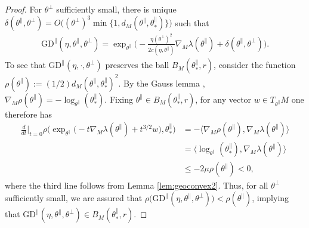 \documentclass{article}
\newcommand{\tpa}{\theta^{\parallel}}
\newcommand{\tpe}{\theta^{\perp}}
\newcommand{\GD}{\mathrm{GD}}
\theoremstyle{plain}
\theoremstyle{definition}
\theoremstyle{remark}
\begin{document}
\begin{proof}
    For $\tpe$ sufficiently small, there is unique $\delta(\tpa,\tpe) = O\big((\tpe)^3\min\{1,d_M(\tpa,\tpa_*)\}\big)$ such that
    \begin{align}
        \GD^{\parallel}(\eta,\tpa,\tpe) = \exp_{\tpa}\bigg(-\frac{\eta(\tpe)^2}{2c(\eta,\tpa)}\nabla_M\lambda(\tpa)+\delta(\tpa,\tpe)\bigg).
    \end{align}
    To see that $\GD^{\parallel}(\eta,\cdot,\tpe)$ preserves the ball $B_M(\tpa_*,r)$, consider the function $\rho(\tpa):=(1/2)d_M(\tpa,\tpa_*)^2$. By the Gauss lemma \cite[Corollary 6.10]{leeriem}, $\nabla_M\rho(\tpa) = -\log_{\tpa}(\tpa_*)$. Fixing $\tpa\in B_M(\tpa_*,r)$, for any vector $w\in T_{\tpa}M$ one therefore has
    \begin{align}
        \frac{d}{dt}\bigg|_{t=0}\rho\bigg(\exp_{\tpa}\big(-t\nabla_M\lambda(\tpa) +t^{3/2}w\big),\tpa_*\bigg)  &= -\langle \nabla_M\rho(\tpa),\nabla_M\lambda(\tpa)\rangle\\&=\langle\log_{\tpa}(\tpa_*),\nabla_M\lambda(\tpa)\rangle\\&\leq -2\mu\rho(\tpa)<0,
    \end{align}
    where the third line follows from Lemma \ref{lem:geoconvex2}. Thus, for all $\tpe$ sufficiently small, we are assured that $\rho\big(\GD^{\parallel}(\eta,\tpa,\tpe)\big)<\rho(\tpa)$, implying that $\GD^{\parallel}(\eta,\tpa,\tpe)\in B_M(\tpa_*,r)$.
    

\end{proof}
\end{document}
